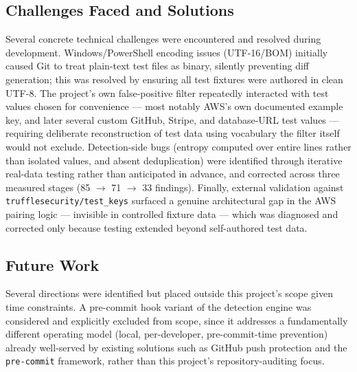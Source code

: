 \documentclass[12pt]{article}
\begin{document}
\subsection{Challenges Faced and Solutions}

Several concrete technical challenges were encountered and resolved during development. Windows/PowerShell encoding issues (UTF-16/BOM) initially caused Git to treat plain-text test files as binary, silently preventing diff generation; this was resolved by ensuring all test fixtures were authored in clean UTF-8. The project's own false-positive filter repeatedly interacted with test values chosen for convenience --- most notably AWS's own documented example key, and later several custom GitHub, Stripe, and database-URL test values --- requiring deliberate reconstruction of test data using vocabulary the filter itself would not exclude. Detection-side bugs (entropy computed over entire lines rather than isolated values, and absent deduplication) were identified through iterative real-data testing rather than anticipated in advance, and corrected across three measured stages (85 $\to$ 71 $\to$ 33 findings). Finally, external validation against \texttt{trufflesecurity/test\_keys} surfaced a genuine architectural gap in the AWS pairing logic --- invisible in controlled fixture data --- which was diagnosed and corrected only because testing extended beyond self-authored test data.

\subsection{Future Work}

Several directions were identified but placed outside this project's scope given time constraints. A pre-commit hook variant of the detection engine was considered and explicitly excluded from scope, since it addresses a fundamentally different operating model (local, per-developer, pre-commit-time prevention) already well-served by existing solutions such as GitHub push protection and the \texttt{pre-commit} framework, rather than this project's repository-auditing focus.
\end{document}
